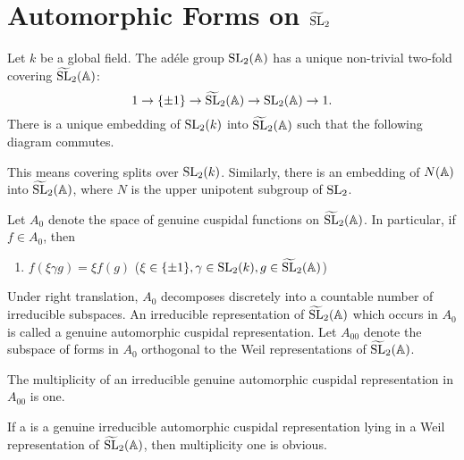 \section{Automorphic Forms on $\widetilde{\mathrm{SL}}_2$}
\label{sec:1}

Let $k$ be a global field.
The ad\'ele group $\mathrm{SL}_2(\mathbb{A})$ has a unique non-trivial two-fold covering $\widetilde{\mathrm{SL}}_2(\mathbb{A})$:
\[
1 \to \{\pm 1\} \to \widetilde{\mathrm{SL}}_2(\mathbb{A}) \to \mathrm{SL}_2(\mathbb{A}) \to 1.
\]
There is a unique embedding of $\mathrm{SL}_2(k)$ into $\widetilde{\mathrm{SL}}_2(\mathbb{A})$ such that the following diagram commutes.

\begin{center}
\end{center}

This means covering splits over $\mathrm{SL}_2(k)$.
Similarly, there is an embedding of $N(\mathbb{A})$ into $\widetilde{\mathrm{SL}}_2(\mathbb{A})$, where $N$ is the upper unipotent subgroup of $\mathrm{SL}_2$.

Let $A_0$ denote the space of genuine cuspidal functions on $\widetilde{\mathrm{SL}}_2(\mathbb{A})$.
In particular, if $f \in A_0$, then

\begin{enumerate}
    \item $f(\xi \gamma g) = \xi f(g)$ \qquad ($\xi \in \{ \pm 1 \}, \gamma \in \mathrm{SL}_2(k), g \in \widetilde{\mathrm{SL}}_2(\mathbb{A})$)
\end{enumerate}

Under right translation, $A_0$ decomposes discretely into a countable number of irreducible subspaces.
An irreducible representation of $\widetilde{\mathrm{SL}}_2(\mathbb{A})$ which occurs in $A_0$ is called a genuine automorphic cuspidal
representation.
Let $A_{00}$ denote the subspace of forms in $A_0$ orthogonal to the Weil representations of $\widetilde{\mathrm{SL}}_2(\mathbb{A})$.

\begin{theorem}
The multiplicity of an irreducible genuine automorphic cuspidal representation in $A_{00}$ is one.
\end{theorem}
\begin{remark*}
If a is a genuine irreducible automorphic cuspidal representation lying in a Weil representation of $\widetilde{\mathrm{SL}}_2(\mathbb{A})$, then multiplicity one is obvious.
\end{remark*}

